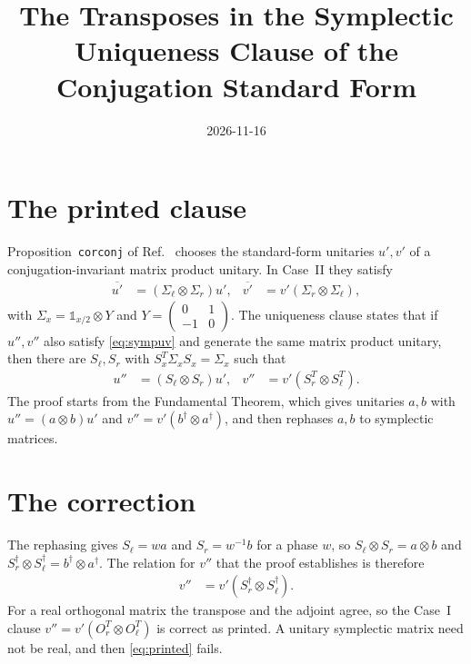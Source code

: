 \documentclass{article}
\title{The Transposes in the Symplectic Uniqueness Clause of the Conjugation Standard Form}
\author{}
\date{2026-11-16}
\begin{document}
\maketitle
{}

\section{The printed clause}

Proposition~\texttt{corconj} of Ref.~\cite{Cirac2017MPU} chooses the
standard-form unitaries $u',v'$ of a conjugation-invariant matrix product
unitary. In Case~II they satisfy
\begin{align}
    \overline{u'} & =(\Sigma_\ell\otimes\Sigma_r)u', &
    \overline{v'} & =v'(\Sigma_r\otimes\Sigma_\ell),
    \label{eq:sympuv}
\end{align}
with $\Sigma_x=\mathbb 1_{x/2}\otimes Y$ and
$Y=\left(\begin{smallmatrix}0&1\\-1&0\end{smallmatrix}\right)$.
The uniqueness clause \cite[lines~1121--1124]{Cirac2017MPU} states that if
$u'',v''$ also satisfy \eqref{eq:sympuv} and generate the same matrix product
unitary, then there are $S_\ell,S_r$ with $S_x^T\Sigma_xS_x=\Sigma_x$ such that
\begin{align}
    u'' & =(S_\ell\otimes S_r)u', &
    v'' & =v'(S_r^T\otimes S_\ell^T).
    \label{eq:printed}
\end{align}
The proof \cite[lines~1151--1163]{Cirac2017MPU} starts from the Fundamental
Theorem, which gives unitaries $a,b$ with $u''=(a\otimes b)u'$ and
$v''=v'(b^\dagger\otimes a^\dagger)$, and then rephases $a,b$ to symplectic
matrices.

\section{The correction}

The rephasing gives $S_\ell=wa$ and $S_r=w^{-1}b$ for a phase $w$, so
$S_\ell\otimes S_r=a\otimes b$ and
$S_r^\dagger\otimes S_\ell^\dagger=b^\dagger\otimes a^\dagger$. The relation
for $v''$ that the proof establishes is therefore
\begin{align}
    v'' & =v'(S_r^\dagger\otimes S_\ell^\dagger).
    \label{eq:corrected}
\end{align}
For a real orthogonal matrix the transpose and the adjoint agree, so the Case~I
clause $v''=v'(O_r^T\otimes O_\ell^T)$ is correct as printed. A unitary
symplectic matrix need not be real, and then \eqref{eq:printed} fails.
\end{document}
